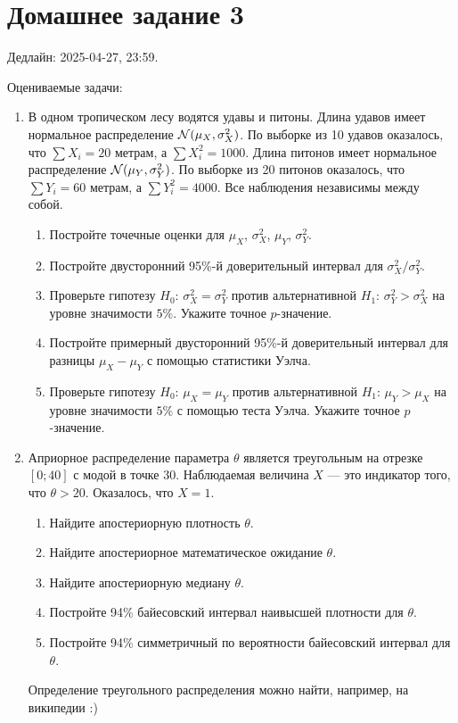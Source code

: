 
\section*{Домашнее задание 3}

Дедлайн: 2025-04-27, 23:59.

Оцениваемые задачи:

\begin{enumerate}
\item В одном тропическом лесу водятся удавы и питоны. 
    Длина удавов имеет нормальное распределение $\mathcal{N}(\mu_X, \sigma^2_X)$. 
    По выборке из 10 удавов оказалось, что $\sum X_i = 20$ метрам, а $\sum X_i^2 = 1000$. 
    Длина питонов имеет нормальное распределение $\mathcal{N}(\mu_Y, \sigma^2_Y)$. 
    По выборке из 20 питонов оказалось, что $\sum Y_i = 60$ метрам, а $\sum Y_i^2 = 4000$.
    Все наблюдения независимы между собой. 
    \begin{enumerate}
      \item Постройте точечные оценки для $\mu_X$, $\sigma^2_X$, $\mu_Y$, $\sigma^2_Y$.
      \item Постройте двусторонний 95\%-й доверительный интервал для $\sigma^2_X/\sigma^2_Y$.
      \item Проверьте гипотезу $H_0$: $\sigma^2_X = \sigma^2_Y$ против альтернативной $H_1$: $\sigma^2_Y > \sigma^2_X$ на уровне значимости $5\%$.
      Укажите точное $p$-значение.
      \item Постройте примерный двусторонний 95\%-й доверительный интервал для разницы  $\mu_X - \mu_Y$ с помощью статистики Уэлча.
      \item Проверьте гипотезу $H_0$: $\mu_X = \mu_Y$ против альтернативной $H_1$: $\mu_Y > \mu_X$ на уровне значимости $5\%$ с помощью теста Уэлча.
      Укажите точное $p$-значение.
    \end{enumerate}
     
    

\item Априорное распределение параметра $\theta$ является треугольным на отрезке $[0; 40]$ с модой в точке $30$. 
Наблюдаемая величина $X$ — это индикатор того, что $\theta > 20$.
Оказалось, что $X = 1$.
    \begin{enumerate}
        \item Найдите апостериорную плотность $\theta$.
        \item Найдите апостериорное математическое ожидание $\theta$.
        \item Найдите апостериорную медиану $\theta$.
        \item Постройте 94\% байесовский интервал наивысшей плотности для $\theta$.
        \item Постройте 94\% симметричный по вероятности байесовский интервал для $\theta$.
    \end{enumerate}

Определение треугольного распределения можно найти, например, на википедии :)

\end{enumerate}

